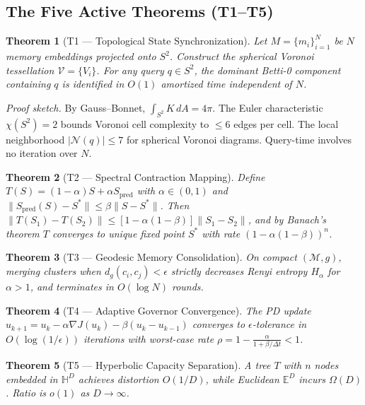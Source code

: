\documentclass[11pt, a4paper]{article}
\theoremstyle{proofform}
\numberwithin{innerpoints}{subsection}
\numberwithin{disproof}{subsection}
\theoremstyle{mathproof}
\newtheorem{theorem}{Theorem}
\begin{document}
\subsection{The Five Active Theorems (T1--T5)}

\begin{theorem}[T1 --- Topological State Synchronization]
Let $M = \{m_i\}_{i=1}^N$ be $N$ memory embeddings projected onto $S^2$. Construct the spherical Voronoi tessellation $\mathcal{V} = \{V_i\}$. For any query $q \in S^2$, the dominant Betti-0 component containing $q$ is identified in $O(1)$ amortized time independent of $N$.
\end{theorem}

\textit{Proof sketch.} By Gauss--Bonnet, $\int_{S^2} K \, dA = 4\pi$. The Euler characteristic $\chi(S^2) = 2$ bounds Voronoi cell complexity to $\leq 6$ edges per cell. The local neighborhood $|\mathcal{N}(q)| \leq 7$ for spherical Voronoi diagrams. Query-time involves no iteration over $N$.

\begin{theorem}[T2 --- Spectral Contraction Mapping]
Define $T(S) = (1-\alpha)S + \alpha S_{\text{pred}}$ with $\alpha \in (0,1)$ and $\|S_{\text{pred}}(S) - S^*\| \leq \beta\|S - S^*\|$. Then $\|T(S_1) - T(S_2)\| \leq [1 - \alpha(1-\beta)]\|S_1 - S_2\|$, and by Banach's theorem $T$ converges to unique fixed point $S^*$ with rate $(1-\alpha(1-\beta))^n$.
\end{theorem}

\begin{theorem}[T3 --- Geodesic Memory Consolidation]
On compact $(\mathcal{M}, g)$, merging clusters when $d_g(c_i, c_j) < \epsilon$ strictly decreases Renyi entropy $H_\alpha$ for $\alpha > 1$, and terminates in $O(\log N)$ rounds.
\end{theorem}

\begin{theorem}[T4 --- Adaptive Governor Convergence]
The PD update $u_{k+1} = u_k - \alpha\nabla J(u_k) - \beta(u_k - u_{k-1})$ converges to $\epsilon$-tolerance in $O(\log(1/\epsilon))$ iterations with worst-case rate $\rho = 1 - \frac{\alpha}{1 + \beta/\Delta t} < 1$.
\end{theorem}

\begin{theorem}[T5 --- Hyperbolic Capacity Separation]
A tree $T$ with $n$ nodes embedded in $\mathbb{H}^D$ achieves distortion $O(1/D)$, while Euclidean $\mathbb{E}^D$ incurs $\Omega(D)$. Ratio is $o(1)$ as $D \to \infty$.
\end{theorem}
\end{document}
